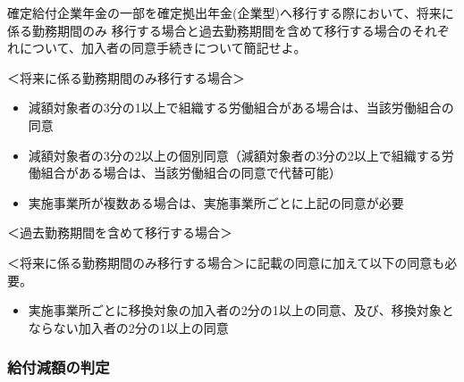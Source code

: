 \begin{shortanswer}[年金1 \ H19 \ 問題2(1)（改題）]
  確定給付企業年金の一部を確定拠出年金(企業型)へ移行する際において、将来に係る勤務期間のみ
  移行する場合と過去勤務期間を含めて移行する場合のそれぞれについて、加入者の同意手続きについて簡記せよ。
\end{shortanswer}

\begin{answerbox}
  ＜将来に係る勤務期間のみ移行する場合＞

  \begin{itemize}
    \item 減額対象者の3分の1以上で組織する労働組合がある場合は、当該労働組合の同意
    \item 減額対象者の3分の2以上の個別同意（減額対象者の3分の2以上で組織する労働組合がある場合は、当該労働組合の同意で代替可能）
    \item 実施事業所が複数ある場合は、実施事業所ごとに上記の同意が必要
  \end{itemize}

  ＜過去勤務期間を含めて移行する場合＞

  
  ＜将来に係る勤務期間のみ移行する場合＞に記載の同意に加えて以下の同意も必要。
  \begin{itemize}
    \item 実施事業所ごとに移換対象の加入者の2分の1以上の同意、及び、移換対象とならない加入者の2分の1以上の同意
  \end{itemize}
\end{answerbox}


\subsubsection{給付減額の判定}

